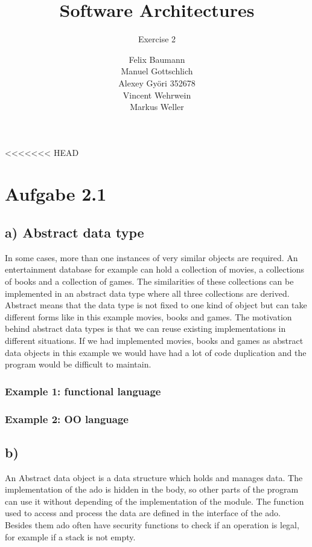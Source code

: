 \documentclass[a4paper,10pt]{scrartcl}[2003/01/01]
\title{Software Architectures}
\subtitle{Exercise 2}
\author{ Felix Baumann \\ Manuel Gottschlich \\  Alexey Gy\"ori 352678 \\ Vincent Wehrwein \\ Markus Weller}
\begin{document}
<<<<<<< HEAD
\maketitle

\section*{Aufgabe 2.1}
\subsection*{a) Abstract data type}
In some cases, more than one instances of very similar objects are required. An  entertainment database for example can hold a collection of movies, a collections of books and a collection of games. The similarities of these collections can be implemented in an abstract data type where all three collections are derived. Abstract means that the data type is not fixed to one kind of object but can take different forms like in this example movies, books and games. The motivation behind abstract data types is that we can reuse existing implementations in different situations. If we had implemented movies, books and games as abstract data objects in this example we would have had a lot of code duplication and the program would be difficult to maintain.

\subsubsection*{Example 1: functional language}


\subsubsection*{Example 2: OO language}



\subsection*{b)}
An Abstract data object is a data structure which holds and manages data. The implementation of the ado is hidden in the body, so other parts of the program can use it without depending of the implementation of the module. The function used to access and process the data are defined in the interface of the ado. Besides them ado often have security functions to check if an operation is legal, for example if a stack is not empty. 
\end{document}
